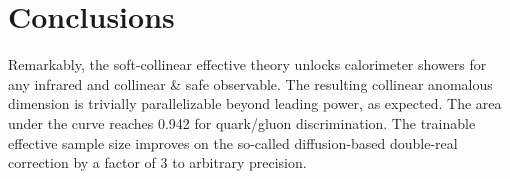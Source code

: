 \section{Conclusions}\label{sec:conclusions}

Remarkably, the soft-collinear effective theory unlocks calorimeter
showers for any infrared and collinear & safe observable. The resulting
collinear anomalous dimension is trivially parallelizable beyond leading
power, as expected. The area under the curve reaches 0.942 for
quark/gluon discrimination. The trainable effective sample size improves
on the so-called diffusion-based double-real correction by a factor of 3
to arbitrary precision.

